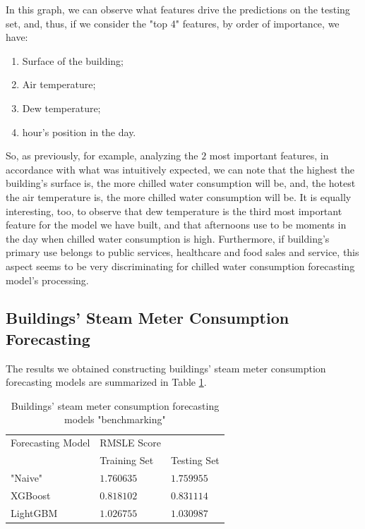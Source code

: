 \documentclass[twocolumn, switch]{article}
\begin{document}
In this graph, we can observe what features drive the predictions on the testing set, and, thus, if we consider the "top 4" features, by order of importance, we have:

\begin{enumerate}
\item Surface of the building;
\item Air temperature;
\item Dew temperature;
\item hour's position in the day.
\end{enumerate}

So, as previously, for example, analyzing the $2$ most important features, in accordance with what was intuitively expected, we can note that the highest the building's surface is, the more chilled water consumption will be, and, the hotest the air temperature is, the more chilled water consumption will be. It is equally interesting, too, to observe that dew temperature is the third most important feature for the model we have built, and that afternoons use to be moments in the day when chilled water consumption is high. Furthermore, if building's primary use belongs to public services, healthcare and food sales and service, this aspect seems to be very discriminating for chilled water consumption forecasting model's processing.

\subsection{Buildings' Steam Meter Consumption Forecasting}

The results we obtained constructing buildings' steam meter consumption forecasting models are summarized in Table \ref{tab:steam_benchmarking}.

\begin{table}[H]
\caption{Buildings' steam meter consumption forecasting models "benchmarking"}
\centering
\begin{tabular}{lll}
\toprule
Forecasting Model & RMSLE Score & \\
& Training Set & Testing Set \\
\midrule
"Naive" & $1.760635$ & $1.759955$ \\
XGBoost & $0.818102$ & $0.831114$ \\
LightGBM & $1.026755$ & $1.030987$ \\
\bottomrule
\end{tabular}
\label{tab:steam_benchmarking}
\end{table}
\end{document}
